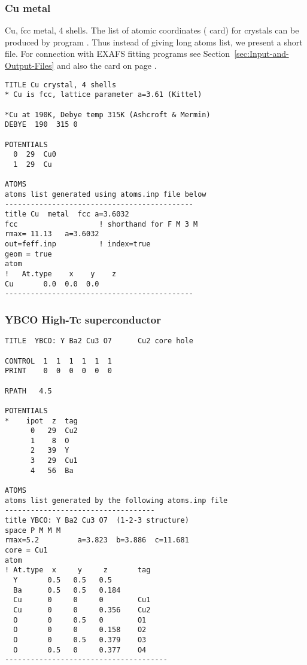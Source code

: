 \documentclass[11pt,oneside]{report} %
\begin{document}
\subsubsection{Cu metal}
\label{sec:Cu-metal}

Cu, fcc metal, 4 shells.  The list of atomic coordinates
( card) for crystals can be produced by program
{\atoms}. Thus instead of giving long atoms list, we present a short
 file.  For connection with EXAFS fitting programs see
Section~\ref{sec:Input-and-Output-Files} and also the 
card on page \pageref{card:pri}.

\begin{verbatim}
TITLE Cu crystal, 4 shells
* Cu is fcc, lattice parameter a=3.61 (Kittel)

*Cu at 190K, Debye temp 315K (Ashcroft & Mermin)
DEBYE  190  315 0

POTENTIALS
  0  29  Cu0
  1  29  Cu

ATOMS
atoms list generated using atoms.inp file below
--------------------------------------------
title Cu  metal  fcc a=3.6032
fcc                   ! shorthand for F M 3 M
rmax= 11.13   a=3.6032
out=feff.inp          ! index=true
geom = true
atom
!   At.type    x    y    z
Cu       0.0  0.0  0.0
--------------------------------------------
\end{verbatim}



\subsubsection{YBCO High-Tc superconductor}
\label{sec:YBCO-High-Tc}


\begin{verbatim}
TITLE  YBCO: Y Ba2 Cu3 O7      Cu2 core hole

CONTROL  1  1  1  1  1  1
PRINT    0  0  0  0  0  0

RPATH   4.5

POTENTIALS
*    ipot  z  tag
      0   29  Cu2
      1    8  O
      2   39  Y
      3   29  Cu1
      4   56  Ba

ATOMS
atoms list generated by the following atoms.inp file
-----------------------------------
title YBCO: Y Ba2 Cu3 O7  (1-2-3 structure)
space P M M M
rmax=5.2         a=3.823  b=3.886  c=11.681
core = Cu1
atom
! At.type  x     y     z       tag
  Y       0.5   0.5   0.5
  Ba      0.5   0.5   0.184
  Cu      0     0     0        Cu1
  Cu      0     0     0.356    Cu2
  O       0     0.5   0        O1
  O       0     0     0.158    O2
  O       0     0.5   0.379    O3
  O       0.5   0     0.377    O4
--------------------------------------
\end{verbatim}
\end{document}
